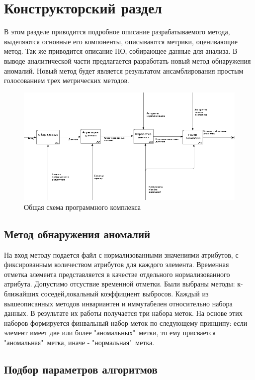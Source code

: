 \chapter{Конструкторский раздел}
В этом разделе приводится подробное описание разрабатываемого метода, выделяются основные его компоненты, описываются метрики, оценивающие метод. Так же приводится описание ПО, собирающее данные для анализа.
В выводе аналитической части предлагается разработать новый метод обнаружения аномалий. Новый метод будет является результатом ансамблирования простым голосованием трех метрических методов.

\begin{figure}[!h]
	\centering
	\includegraphics[width=.9\textwidth]{img2/idef0.png}
	\caption{Общая схема программного комплекса}
	\label{fig08}
\end{figure}
\section{Метод обнаружения аномалий}
На вход методу подается файл с нормализованными значениями атрибутов, с фиксированным количеством атрибутов для каждого элемента. Временная отметка элемента представляется в качестве отдельного нормализованного атрибута. Допустимо отсуствие временной отметки.
Были выбраны методы: к-ближайших соседей,локальный коэффициент выбросов.
Каждый из вышеописанных методов инвариантен и иммутабелен относительно набора данных. В результате их работы получается три набора меток. На основе этих наборов формируется финвальный набор меток по следующему принципу: если элемент имеет две или более "аномальных"\ метки, то ему присвается "аномальная"\ метка, иначе - "нормальная"\ метка.
\section{Подбор параметров алгоритмов}
